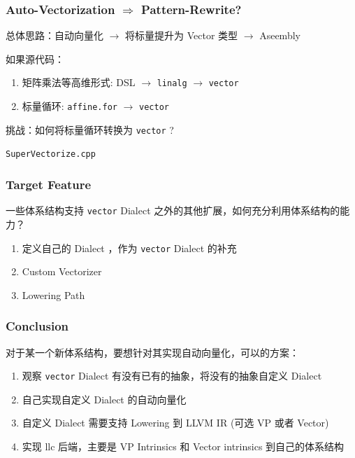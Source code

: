 \documentclass[aspectratio=169]{ctexbeamer}
\begin{document}
\begin{frame}
    \frametitle{Auto-Vectorization $\Rightarrow$ Pattern-Rewrite?}

    总体思路：自动向量化 $\rightarrow$ 将标量提升为 Vector 类型 $\rightarrow$ Aseembly

    \hspace{2em}

    如果源代码：
    \begin{enumerate}
        \item 矩阵乘法等高维形式: DSL $\rightarrow$ \texttt{linalg} $\rightarrow$ \texttt{vector}
        \item 标量循环: \texttt{affine.for} $\rightarrow$ \texttt{vector}
    \end{enumerate}

    \begin{center}
        挑战：如何将标量循环转换为 \texttt{vector} ?

        \vspace{1.5em}

        \texttt{SuperVectorize.cpp}
    \end{center}

\end{frame}

\begin{frame}
    \frametitle{Target Feature}

    一些体系结构支持 \texttt{vector} Dialect 之外的其他扩展，如何充分利用体系结构的能力？

    \vspace{1.5em}

    \begin{enumerate}
        \item 定义自己的 Dialect ，作为 \texttt{vector} Dialect 的补充
        \item Custom Vectorizer
        \item Lowering Path
    \end{enumerate}

\end{frame}


\begin{frame}
    \frametitle{Conclusion}

    对于某一个新体系结构，要想针对其实现自动向量化，可以的方案：

    \begin{enumerate}
        \item 观察 \texttt{vector} Dialect 有没有已有的抽象，将没有的抽象自定义 Dialect
        \item 自己实现自定义 Dialect 的自动向量化
        \item 自定义 Dialect 需要支持 Lowering 到 LLVM IR (可选 VP 或者 Vector)
        \item 实现 llc 后端，主要是 VP Intrinsics 和 Vector intrinsics 到自己的体系结构
    \end{enumerate}

\end{frame}
\end{document}
